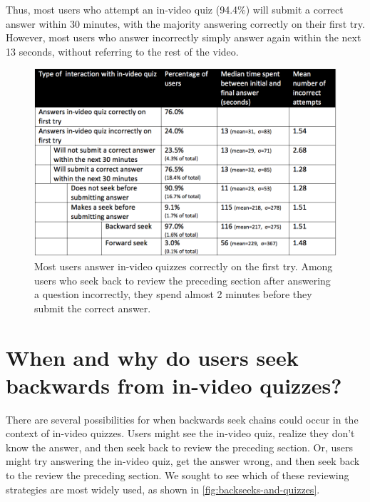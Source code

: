 \documentclass{sigchi}
\begin{document}
Thus, most users who attempt an in-video quiz (94.4\%) will submit a correct answer within 30 minutes, with the majority answering correctly on their first try.  However, most users who answer incorrectly simply answer again within the next 13 seconds, without referring to the rest of the video. %

\begin{figure}
\includegraphics[width=1.0\columnwidth]{time-spent-on-quizzes}
\caption{Most users answer in-video quizzes correctly on the first try. Among users who seek back to review the preceding section after answering a question incorrectly, they spend almost 2 minutes before they submit the correct answer.}
\label{fig:time-spent-on-quizzes}
\end{figure}



\section{When and why do users seek backwards from in-video quizzes?}

There are several possibilities for when backwards seek chains could occur in the context of in-video quizzes. Users might see the in-video quiz, realize they don't know the answer, and then seek back to review the preceding section. Or, users might try answering the in-video quiz, get the answer wrong, and then seek back to the review the preceding section. We sought to see which of these reviewing strategies are most widely used, as shown in \autoref{fig:backseeks-and-quizzes}.
\end{document}
